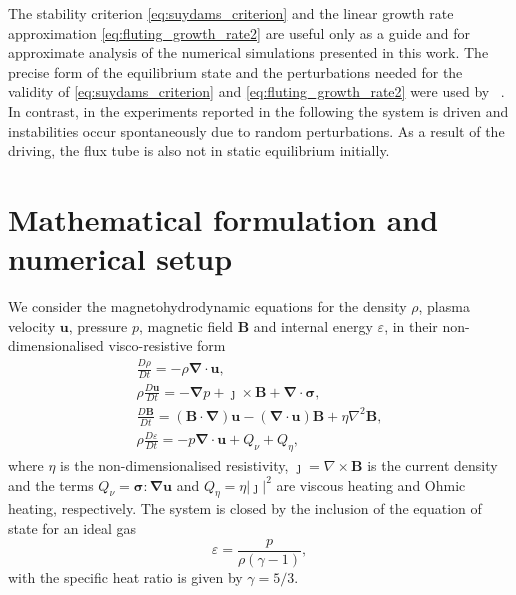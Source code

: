 \documentclass[fleqn,usenatbib]{mnras}
\newcommand{\revcite}[1]{{\color{red} \underline{#1}}}
\newcommand{\ten}[1]{{\bm #1}}
\renewcommand{\vec}[1]{{\bm #1}}
\begin{document}
The stability criterion \eqref{eq:suydams_criterion} and the linear growth rate
approximation \eqref{eq:fluting_growth_rate2} are useful only as a guide and
for approximate analysis of the numerical simulations presented in this work.
The precise form of the equilibrium state and the perturbations needed for the
validity of \eqref{eq:suydams_criterion} and \eqref{eq:fluting_growth_rate2}
were used by~\revcite{\citet{quinnEffectAnisotropicViscosity2020}}. In contrast, in the
experiments reported in the following the system is driven and instabilities
occur spontaneously due to random perturbations. As a result of the driving, the
flux tube is also not in static equilibrium initially.

\section{Mathematical formulation and numerical setup}
\label{sec-numerical-setup}

We consider the magnetohydrodynamic equations for the density $\rho$, plasma
velocity $\vec{u}$, pressure $p$, magnetic field $\vec{B}$ and internal energy
$\varepsilon$, in their non-dimensionalised visco-resistive form
\begin{subequations}
  \label{eq:MHD}
  \begin{gather}
\label{eq:mhda}
\frac{D\rho}{Dt} = - \rho \vec{\nabla} \cdot \vec{u},\\
\rho\frac{D\vec{u}}{Dt} = -\vec{\nabla} p + \vec{\jmath} \times \vec{B} + \vec{\nabla} \cdot \ten{\sigma},\\
\frac{D\vec{B}}{Dt} = (\vec{B} \cdot \vec{\nabla})\vec{u} - (\vec{\nabla} \cdot \vec{u})\vec{B} + \eta \nabla^2 \vec{B},\\
\rho\frac{D\varepsilon}{Dt} = -p \vec{\nabla} \cdot \vec{u} + {Q}_{\nu} + {Q}_{\eta},%
    \end{gather}
\end{subequations}
where $\eta$ is the non-dimensionalised resistivity, $\vec{\jmath} = \nabla
\times \vec{B}$ is the current density and the terms ${Q}_{\nu} = \ten{\sigma}
: \vec{\nabla}\vec{u}$ and ${Q}_{\eta} = \eta | \vec{\jmath} |^2$ are viscous
heating and Ohmic heating, respectively. The system is closed by the inclusion
of the equation of state for an ideal gas 
\begin{equation}
\varepsilon = \frac{p}{\rho(\gamma - 1)},
\end{equation}
with the specific heat ratio is given by $\gamma = 5/3$.
\end{document}
